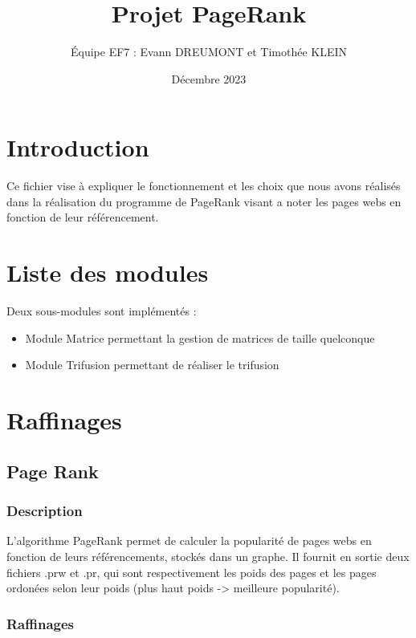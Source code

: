 \documentclass{NewTeXRaffinage}
\title{Projet PageRank}
\author{\'Equipe  EF7 : Evann DREUMONT  et  Timothée KLEIN}
\date{Décembre 2023}
\begin{document}
\maketitle

\tableofcontents

\newpage

\section{Introduction}
Ce fichier vise à expliquer le fonctionnement et les choix que nous avons réalisés dans la réalisation du programme de PageRank visant a noter les pages webs en fonction de leur référencement.
\section{Liste des modules}
Deux sous-modules sont implémentés : \\
\begin{itemize}
    \item Module Matrice permettant la gestion de matrices de taille quelconque
    \item Module Trifusion permettant de réaliser le trifusion
\end{itemize}



\section{Raffinages}




\subsection{Page Rank}


\subsubsection{Description}
L'algorithme PageRank permet de calculer la popularité de pages webs en fonction de leurs référencements, stockés dans un graphe. Il fournit en sortie deux fichiers .prw et .pr, qui sont respectivement les poids des pages et les pages ordonées selon leur poids (plus haut poids -> meilleure popularité).

\subsubsection{Raffinages}
\end{document}
